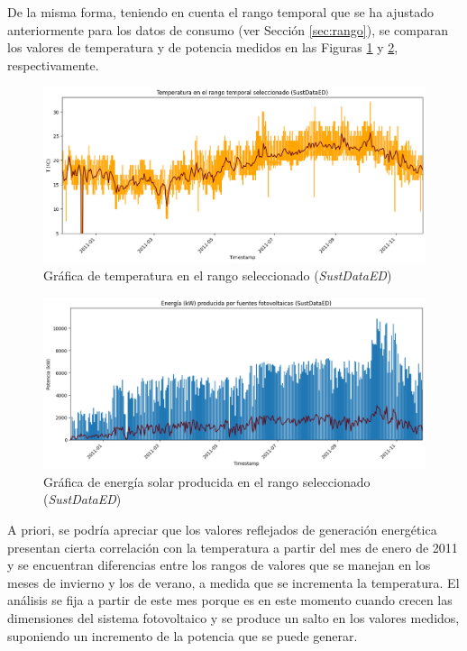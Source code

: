 \vspace{3mm}

De la misma forma, teniendo en cuenta el rango temporal que se ha ajustado anteriormente para los datos de consumo (ver Sección \ref{sec:rango}), se comparan los valores de temperatura y de potencia medidos en las Figuras \ref{fig:temp} y \ref{fig:solaryear}, respectivamente. 

\vspace{3mm}

\begin{figure}[H]
  \centering
  \includegraphics[width=1\textwidth]{img/diseno/temp.png}
  \caption{Gráfica de temperatura en el rango seleccionado (\textit{SustDataED})}
  \label{fig:temp}
\end{figure}

\vspace{3mm}

\begin{figure}[H]
  \centering
  \includegraphics[width=1\textwidth]{img/diseno/matplotsolaryear.png}
  \caption{Gráfica de energía solar producida en el rango seleccionado (\textit{SustDataED})}
  \label{fig:solaryear}
\end{figure}

\vspace{3mm}

A priori, se podría apreciar que los valores reflejados de generación energética presentan cierta correlación con la temperatura a partir del mes de enero de 2011 y se encuentran diferencias entre los rangos de valores que se manejan en los meses de invierno y los de verano, a medida que se incrementa la temperatura. El análisis se fija a partir de este mes porque es en este momento cuando crecen las dimensiones del sistema fotovoltaico y se produce un salto en los valores medidos, suponiendo un incremento de la potencia que se puede generar. 

